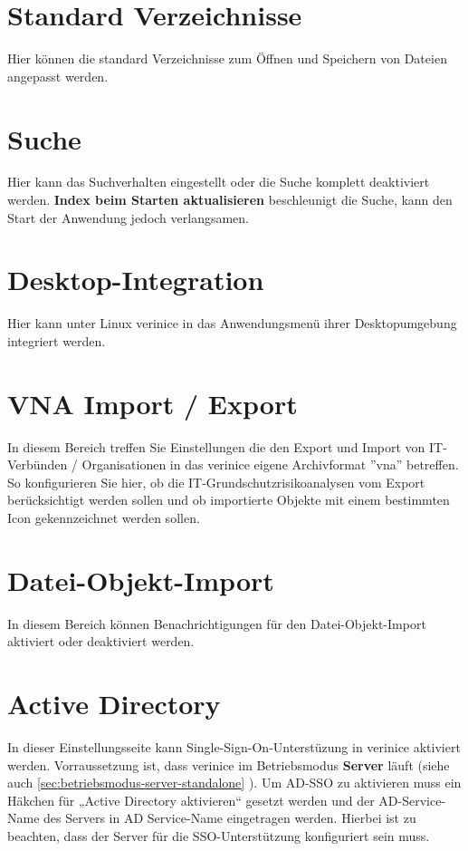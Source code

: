 \documentclass[a4paper,10pt]{book}
\begin{document}
\section{Standard Verzeichnisse}\label{sec:default_dir}
Hier können die standard Verzeichnisse zum Öffnen und Speichern von Dateien
angepasst werden.

\section{Suche}\label{sec:search}
Hier kann das Suchverhalten eingestellt oder die Suche komplett deaktiviert
werden. \textbf{Index beim Starten aktualisieren} beschleunigt die Suche, kann
den Start der Anwendung jedoch verlangsamen.

\section{Desktop-Integration}\label{sec:desktop-integration}
Hier kann unter Linux verinice in das Anwendungsmenü ihrer Desktopumgebung integriert werden.

\section{VNA Import / Export}
In diesem Bereich treffen Sie Einstellungen die den Export und Import von IT-Verbünden / Organisationen in das verinice eigene Archivformat ''vna''
betreffen. So konfigurieren Sie hier, ob die IT-Grundschutzrisikoanalysen vom Export berücksichtigt werden sollen und ob importierte Objekte mit einem bestimmten Icon
gekennzeichnet werden sollen.

\section{Datei-Objekt-Import}\label{sec:file-object-import}
In diesem Bereich können Benachrichtigungen für den Datei-Objekt-Import
aktiviert oder deaktiviert werden.

\section{Active Directory}
\label{active-directory}

In dieser Einstellungsseite kann Single-Sign-On-Unterstüzung in
verinice aktiviert werden. Vorraussetzung ist, dass verinice im
Betriebsmodus \textbf{Server} läuft (siehe auch
\ref{sec:betriebsmodus-server-standalone} \glqq
{}\grqq). Um AD-SSO zu
aktivieren muss ein Häkchen für „Active Directory aktivieren“
gesetzt werden und der AD-Service-Name des Servers in AD
Service-Name eingetragen werden.  Hierbei ist zu beachten, dass der
Server für die SSO-Unterstützung konfiguriert sein muss.
\end{document}
